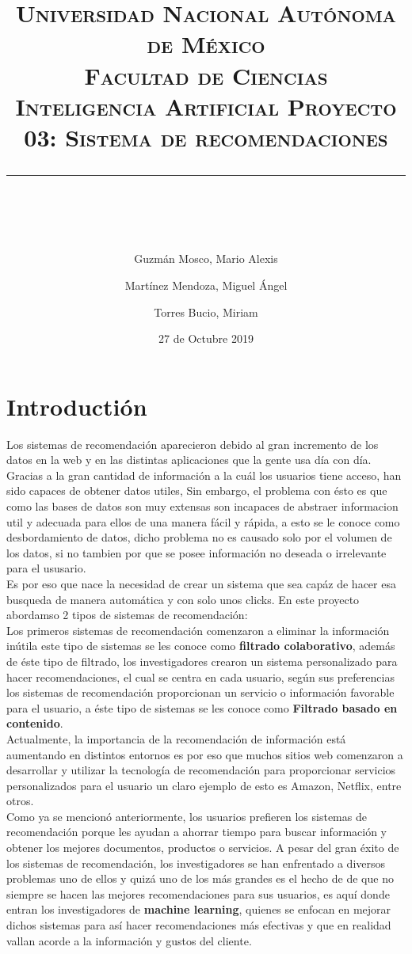 \documentclass[10pt, a4paper]{article}
\title{\begin{center}
 {\LARGE \scshape Universidad Nacional Aut\'onoma de M\'exico \\ Facultad de Ciencias \\ Inteligencia Artificial Proyecto 03: Sistema de recomendaciones }
  \rule{1\textwidth}{2.0pt}\\
\end{center}}
\author{
  Guzmán Mosco, Mario Alexis\\
  \and  
  Mart\'inez Mendoza, Miguel \'Angel\\
  \and
  Torres Bucio, Miriam\\
}
\date{27 de Octubre 2019}
\begin{document}
\maketitle

\section{Introducti\'on}
Los sistemas de recomendaci\'on aparecieron debido al gran incremento de los datos en la web y en las distintas aplicaciones que la gente usa d\'ia con d\'ia. Gracias a la gran cantidad de informaci\'on a la cu\'al los usuarios tiene acceso, han sido capaces de obtener datos utiles, Sin embargo, el problema con \'esto es que como las bases de datos son muy extensas son incapaces de abstraer informacion util y adecuada para ellos de una manera f\'acil y r\'apida, a esto se le conoce como desbordamiento de datos, dicho problema no es causado solo por el volumen de los datos, si no tambien por que se posee informaci\'on no deseada o irrelevante para el ususario.\\
Es por eso que nace la necesidad de crear un sistema que sea cap\'az de hacer esa busqueda de manera autom\'atica y con solo unos clicks.
En este proyecto abordamso 2 tipos de sistemas de recomendaci\'on: \\
Los primeros sistemas de recomendación comenzaron a eliminar la información inútila este tipo de sistemas se les conoce como \textbf{filtrado colaborativo}, además de \'este tipo de filtrado, los investigadores crearon un sistema personalizado para hacer recomendaciones, el cual se centra en cada usuario, según sus preferencias los sistemas de recomendación proporcionan un servicio o información favorable para el usuario, a \'este tipo de sistemas se les conoce como \textbf{Filtrado basado en contenido}.\\ Actualmente, la importancia de la recomendación de información está aumentando en distintos entornos es por eso que muchos sitios web comenzaron a desarrollar y utilizar la tecnología de recomendación para proporcionar servicios personalizados para el usuario un claro ejemplo de esto es Amazon, Netflix, entre otros.\\
Como ya se mencion\'o anteriormente, los usuarios prefieren los sistemas de recomendación porque les ayudan a ahorrar tiempo para buscar información y obtener los mejores documentos, productos o servicios. A pesar del gran \'exito de los sistemas de recomendaci\'on, los investigadores se han enfrentado a diversos problemas uno de ellos y quiz\'a uno de los m\'as grandes es el hecho de de que no siempre se hacen las mejores recomendaciones para sus usuarios, es aqu\'i donde entran los investigadores de \textbf{machine learning}, quienes se enfocan en mejorar dichos sistemas para as\'i hacer recomendaciones m\'as efectivas y que en realidad vallan acorde a la informaci\'on y gustos del cliente.\\  
\end{document}
